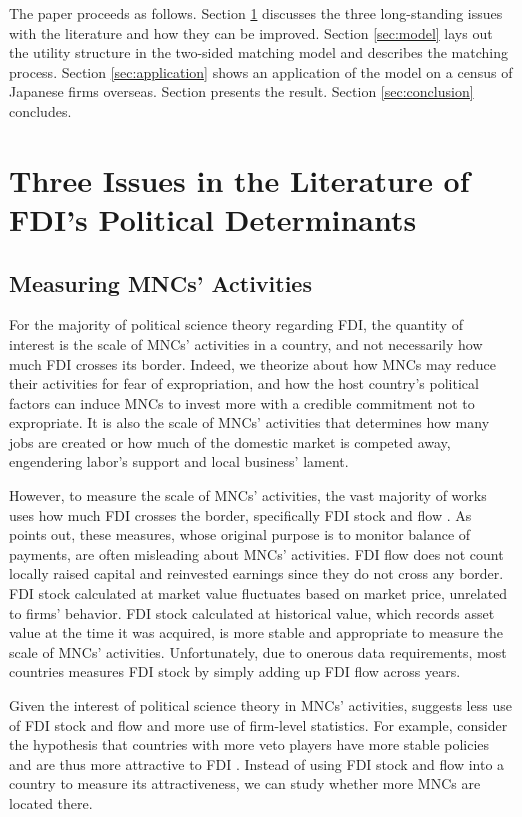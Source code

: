 The paper proceeds as follows. Section \ref{sec:literature_issues} discusses the
three long-standing issues with the literature and how they can be improved.
Section \ref{sec:model} lays out the utility structure in the two-sided matching
model and describes the matching process. Section \ref{sec:application} shows an
application of the model on a census of Japanese firms overseas. Section
presents the result. Section \ref{sec:conclusion} concludes.

\section{Three Issues in the Literature of FDI's Political Determinants}
\label{sec:literature_issues}

\subsection{Measuring MNCs' Activities}

For the majority of political science theory regarding FDI, the quantity of interest is the scale of MNCs' activities in a country, and not necessarily how much FDI crosses its border. Indeed, we theorize about how MNCs may reduce their activities for fear of expropriation, and how the host country's political factors can induce MNCs to invest more with a credible commitment not to expropriate. It is also the scale of MNCs' activities that determines how many jobs are created or how much of the domestic market is competed away, engendering labor's support and local business' lament.

However, to measure the scale of MNCs' activities, the vast majority of works uses how much FDI crosses the border, specifically FDI stock and flow \citep{Jensen2003, Ahlquist2006, Beazer2011, Graham2010}. As \citet{Kerner2014} points out, these measures, whose original purpose is to monitor balance of payments, are often misleading about MNCs' activities. FDI flow does not count locally raised capital and reinvested earnings since they do not cross any border. FDI stock calculated at market value fluctuates based on market price, unrelated to firms' behavior. FDI stock calculated at historical value, which records asset value at the time it was acquired, is more stable and appropriate to measure the scale of MNCs' activities. Unfortunately, due to onerous data requirements, most countries measures FDI stock by simply adding up FDI flow across years.

Given the interest of political science theory in MNCs' activities, \citet{Kerner2014} suggests less use of FDI stock and flow and more use of firm-level statistics. For example, consider the hypothesis that countries with more veto players have more stable policies and are thus more attractive to FDI \citep{Li2009a}. Instead of using FDI stock and flow into a country to measure its attractiveness, we can study whether more MNCs are located there.

